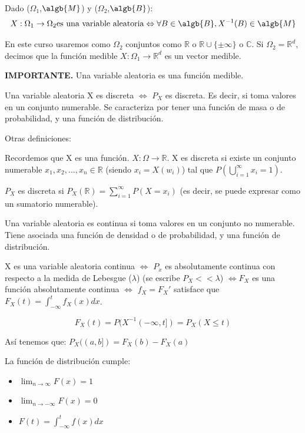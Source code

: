 \documentclass{apuntes}
\begin{document}
\begin{defn} 
Dado ($\Omega_1$,$\algb{M}$) y ($\Omega_2$,$\algb{B}$):
\[
X: \Omega_1 \rightarrow \Omega_2 \text{es una variable aleatoria} \Leftrightarrow \forall B \in \algb{B}, X^{-1}(B) \in \algb{M}
\]

En este curso usaremos como $\Omega_2$ conjuntos como $\mathbb{R}$ o $\mathbb{R} \cup \{\pm \infty\}$ o $\mathbb{C}$. Si $\Omega_2 = \mathbb{R}^d$, decimos que la función medible $X: \Omega_1 \rightarrow \mathbb{R}^d$ es un vector medible.
\end{defn}
\obs \textbf{IMPORTANTE. }Una variable aleatoria es una función medible.

\begin{defn}
Una variable aleatoria X es discreta $\Leftrightarrow$ $P_X$ es discreta. Es decir, si toma valores en un conjunto numerable. Se caracteriza por tener una función de masa o de probabilidad, y una función de distribución.

Otras definiciones:

Recordemos que X es una función. $X: \Omega \rightarrow \mathbb{R}$. X es discreta si existe un conjunto numerable $x_1, x_2,...,x_n \in \mathbb{R}$ (siendo $x_i=X(w_i)$) tal que $P(\bigcup_{i=1}^{\infty}x_i=1)$.

$P_X$ es discreta si $P_X(\mathbb{R})=\sum_{i=1}^{\infty}P(X=x_i)$ (es decir, se puede expresar como un sumatorio numerable).
\end{defn}

\begin{defn}
Una variable aleatoria es continua si toma valores en un conjunto no numerable. Tiene asociada una función de densidad o de probabilidad, y una función de distribución.

X es una variable aleatoria continua $\Leftrightarrow$ $P_x$ es absolutamente continua con respecto a la medida de Lebesgue ($\lambda$) (se escribe $P_X << \lambda$) $\Leftrightarrow F_X$ es una función absolutamente continua $\Leftrightarrow$ $f_X=F_X'$ satisface que $F_X(t)=\int_{-\infty}^{t}f_X(x)dx$.
\end{defn}

\begin{defn}
\[
F_X(t)=P(X^{-1}(-\infty,t])=P_X(X \leq t)
\]

Así tenemos que: $P_X((a,b])=F_X(b)-F_X(a)$

La función de distribución cumple:
\begin{itemize}
\item $\lim_{n \rightarrow \infty}F(x)=1$
\item $\lim_{n \rightarrow -\infty}F(x)=0$
\item $F(t)=\int_{-\infty}^{t}f(x)dx$
\end{itemize}

\end{defn}
\end{document}
